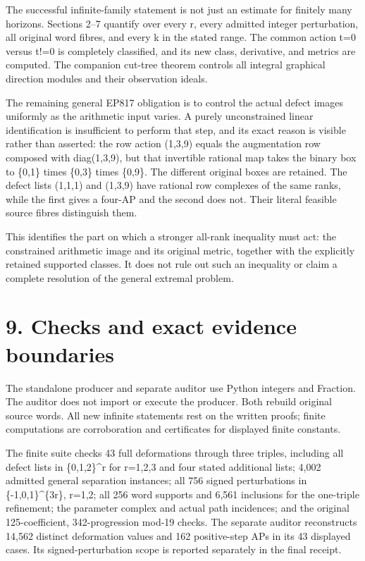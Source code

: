 The successful infinite-family statement is not just an estimate for finitely many horizons. Sections 2--7 quantify over every r, every admitted integer perturbation, all original word fibres, and every k in the stated range. The common action t=0 versus t!=0 is completely classified, and its new class, derivative, and metrics are computed. The companion cut-tree theorem controls all integral graphical direction modules and their observation ideals.

The remaining general EP817 obligation is to control the actual defect images uniformly as the arithmetic input varies. A purely unconstrained linear identification is insufficient to perform that step, and its exact reason is visible rather than asserted: the row action (1,3,9) equals the augmentation row composed with diag(1,3,9), but that invertible rational map takes the binary box to \{0,1\} times \{0,3\} times \{0,9\}. The different original boxes are retained. The defect lists (1,1,1) and (1,3,9) have rational row complexes of the same ranks, while the first gives a four-AP and the second does not. Their literal feasible source fibres distinguish them.

This identifies the part on which a stronger all-rank inequality must act: the constrained arithmetic image and its original metric, together with the explicitly retained supported classes. It does not rule out such an inequality or claim a complete resolution of the general extremal problem.

\section{9. Checks and exact evidence boundaries}\label{n12-checks-and-exact-evidence-boundaries}

The standalone producer and separate auditor use Python integers and Fraction. The auditor does not import or execute the producer. Both rebuild original source words. All new infinite statements rest on the written proofs; finite computations are corroboration and certificates for displayed finite constants.

The finite suite checks 43 full deformations through three triples, including all defect lists in \{0,1,2\}\^{}r for r=1,2,3 and four stated additional lists; 4,002 admitted general separation instances; all 756 signed perturbations in \{-1,0,1\}\^{}\{3r\}, r=1,2; all 256 word supports and 6,561 inclusions for the one-triple refinement; the parameter complex and actual path incidences; and the original 125-coefficient, 342-progression mod-19 checks. The separate auditor reconstructs 14,562 distinct deformation values and 162 positive-step APs in its 43 displayed cases. Its signed-perturbation scope is reported separately in the final receipt.

